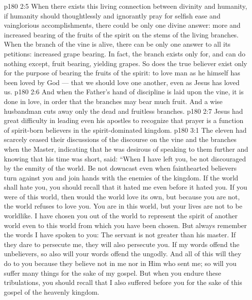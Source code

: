 \vs p180 2:5 When there exists this living connection between divinity and humanity, if humanity should thoughtlessly and ignorantly pray for selfish ease and vainglorious accomplishments, there could be only one divine answer: more and increased bearing of the fruits of the spirit on the stems of the living branches. When the branch of the vine is alive, there can be only one answer to all its petitions: increased grape bearing. In fact, the branch exists only for, and can do nothing except, fruit bearing, yielding grapes. So does the true believer exist only for the purpose of bearing the fruits of the spirit: to love man as he himself has been loved by God --- that we should love one another, even as Jesus has loved us.
\vs p180 2:6 And when the Father’s hand of discipline is laid upon the vine, it is done in love, in order that the branches may bear much fruit. And a wise husbandman cuts away only the dead and fruitless branches.
\vs p180 2:7 Jesus had great difficulty in leading even his apostles to recognize that prayer is a function of spirit\hyp{}born believers in the spirit\hyp{}dominated kingdom.
\vs p180 3:1 The eleven had scarcely ceased their discussions of the discourse on the vine and the branches when the Master, indicating that he was desirous of speaking to them further and knowing that his time was short, said: “When I have left you, be not discouraged by the enmity of the world. Be not downcast even when fainthearted believers turn against you and join hands with the enemies of the kingdom. If the world shall hate you, you should recall that it hated me even before it hated you. If you were of this world, then would the world love its own, but because you are not, the world refuses to love you. You are in this world, but your lives are not to be worldlike. I have chosen you out of the world to represent the spirit of another world even to this world from which you have been chosen. But always remember the words I have spoken to you: The servant is not greater than his master. If they dare to persecute me, they will also persecute you. If my words offend the unbelievers, so also will your words offend the ungodly. And all of this will they do to you because they believe not in me nor in Him who sent me; so will you suffer many things for the sake of my gospel. But when you endure these tribulations, you should recall that I also suffered before you for the sake of this gospel of the heavenly kingdom.
